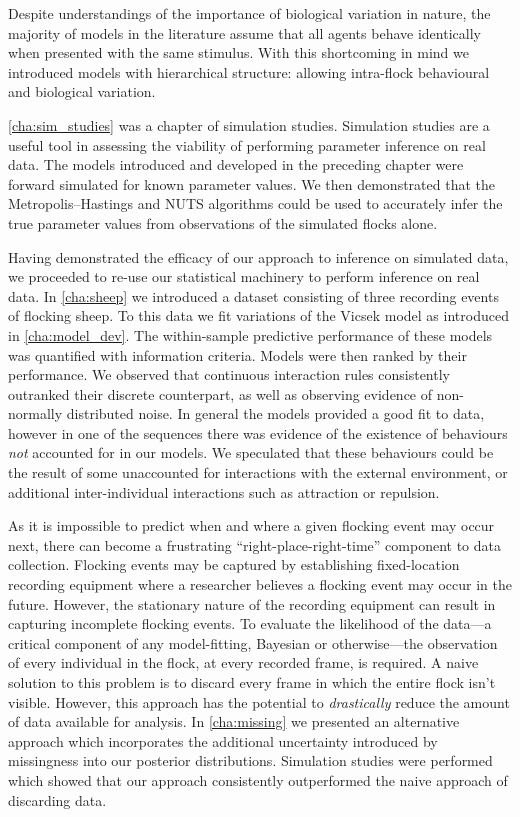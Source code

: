 Despite understandings of the importance of biological variation in nature, the
majority of models in the literature assume that all agents behave identically
when presented with the same stimulus. With this shortcoming in mind we
introduced models with hierarchical structure: allowing intra-flock behavioural
and biological variation.

\cref{cha:sim_studies} was a chapter of simulation studies. Simulation studies
are a useful tool in assessing the viability of performing parameter inference
on real data. The models introduced and developed in the preceding chapter
were forward simulated for known parameter values. We then demonstrated that
the Metropolis--Hastings and NUTS algorithms could be used to accurately infer
the true parameter values from observations of the simulated flocks alone.

Having demonstrated the efficacy of our approach to inference on simulated
data, we proceeded to re-use our statistical machinery to perform inference on
real data. In \cref{cha:sheep} we introduced a dataset consisting of three
recording events of flocking sheep. To this data we fit variations of the
Vicsek model as introduced in \cref{cha:model_dev}. The within-sample
predictive performance of these models was quantified with information
criteria. Models were then ranked by their performance. We observed that
continuous interaction rules consistently outranked their discrete counterpart,
as well as observing evidence of non-normally distributed noise. In general the
models provided a good fit to data, however in one of the sequences there was
evidence of the existence of behaviours \emph{not} accounted for in our models.
We speculated that these behaviours could be the result of some unaccounted for
interactions with the external environment, or additional inter-individual
interactions such as attraction or repulsion.

As it is impossible to predict when and where a given flocking event may occur
next, there can become a frustrating ``right-place-right-time'' component to
data collection. Flocking events may be captured by establishing fixed-location
recording equipment where a researcher believes a flocking event may occur in
the future. However, the stationary nature of the recording equipment can
result in capturing incomplete flocking events. To evaluate the likelihood of
the data---a critical component of any model-fitting, Bayesian or
otherwise---the observation of every individual in the flock, at every recorded
frame, is required. A naive solution to this problem is to discard every frame
in which the entire flock isn't visible. However, this approach has the
potential to \emph{drastically} reduce the amount of data available for
analysis. In \cref{cha:missing} we presented an alternative approach which
incorporates the additional uncertainty introduced by missingness into our
posterior distributions. Simulation studies were performed which showed that
our approach consistently outperformed the naive approach of discarding data.

